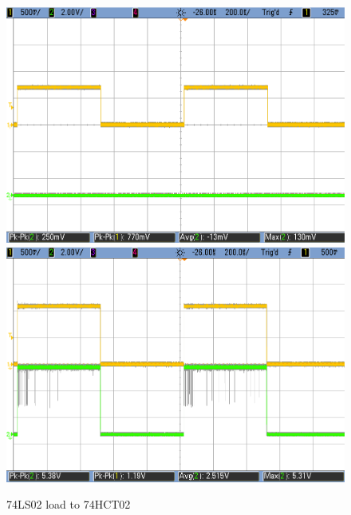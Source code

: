 \begin{figure}[h!]
        \includegraphics[scale=0.19]{../Exercise2/LS-HCT-0p7V.png}\\
        \vspace{0.2cm}
        \includegraphics[scale=0.19]{../Exercise2/LS-HCT-1p1V.png}
        \caption{\color{cyan}74LS02 load to 74HCT02}
        \label{fig:ej2exlstohct}
    \end{figure}


